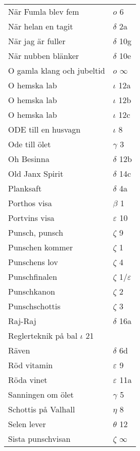 \documentclass[a6paper,10pt]{article}
\begin{document}
\newpage
\setlength{\oddsidemargin}{-0.47in}
\begin{table}[!h]
\begin{tabular}{l l}
När Fumla blev fem&  $o$ 6\\
När helan en tagit	&$\delta$ 2a\\
När jag är fuller&	$\delta$ 10g\\
När nubben blänker&	$\delta$ 10e\\
O gamla klang och jubeltid&	$o$ $\infty$\\
O hemska lab&	$\iota$ 12a\\
O hemska lab&	$\iota$ 12b\\
O hemska lab&	$\iota$ 12c\\
ODE till en husvagn	&$\iota$ 8\\
Ode till ölet&	$\gamma$ 3\\
Oh Besinna&	$\delta$ 12b\\
Old Janx Spirit&	$\delta$ 14c\\
Planksaft	&$\delta$ 4a\\
Porthos visa&	$\beta$ 1\\
Portvins visa	&$\varepsilon$ 10\\
Punsch, punsch	&$\zeta$ 9\\
Punschen kommer&	$\zeta$ 1\\
Punschens lov&	$\zeta$ 4\\
Punschfinalen	&$\zeta$ 1/$\varepsilon$\\
Punschkanon&	$\zeta$ 2\\
Punschschottis	&$\zeta$ 3\\
Raj-Raj&	$\delta$ 16a\\
Reglerteknik på bal $\iota$ 21\\
Räven&	$\delta$ 6d\\
Röd vitamin	&$\varepsilon$ 9\\
Röda vinet&	$\varepsilon$ 11a\\
Sanningen om ölet&	$\gamma$ 5\\
Schottis på Valhall&	$\eta$ 8\\
Selen lever	&$\theta$ 12\\
Sista punschvisan	&$\zeta$ $\infty$\\
\end{tabular}
\end{table}
\end{document}
